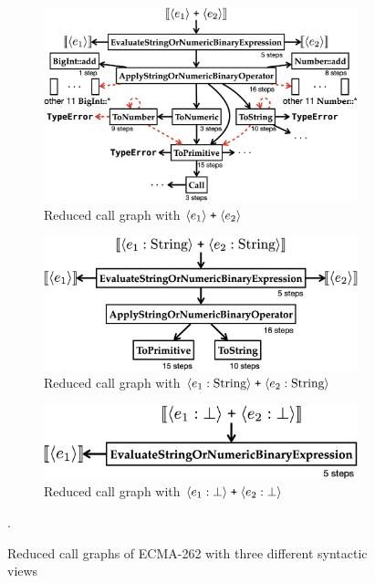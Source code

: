 \begin{figure}
  \centering
  \begin{minipage}[b]{\columnwidth}
    \begin{subfigure}[t]{\columnwidth}
      \centering
      \includegraphics[width=\textwidth]{img/add-basic.png}
      \caption{Reduced call graph with $\svhole{\expr_1} \; \code{+} \;
      \svhole{\expr_2}$}
    \end{subfigure}
  \end{minipage}
  \begin{minipage}[b]{\columnwidth}
    \begin{subfigure}[t]{\columnwidth}
      \centering
      \includegraphics[width=.8\textwidth]{img/add-str.png}
      \caption{Reduced call graph with $\svhole{\expr_1: \text{String}} \;
      \code{+} \; \svhole{\expr_2: \text{String}}$}
    \end{subfigure}
    \begin{subfigure}[t]{\columnwidth}
      \centering
      \includegraphics[width=.7\textwidth]{img/add-exc.png}
      \caption{Reduced call graph with $\svhole{\expr_1: \bot} \; \code{+} \;
      \svhole{\expr_2: \bot}$}
    \end{subfigure}
  \end{minipage}
  \vspace*{-.5em}
  \caption{Reduced call graphs of ECMA-262 with three different syntactic views}
  \vspace*{-1.5em}
  \label{fig:add-graph}.
\end{figure}

